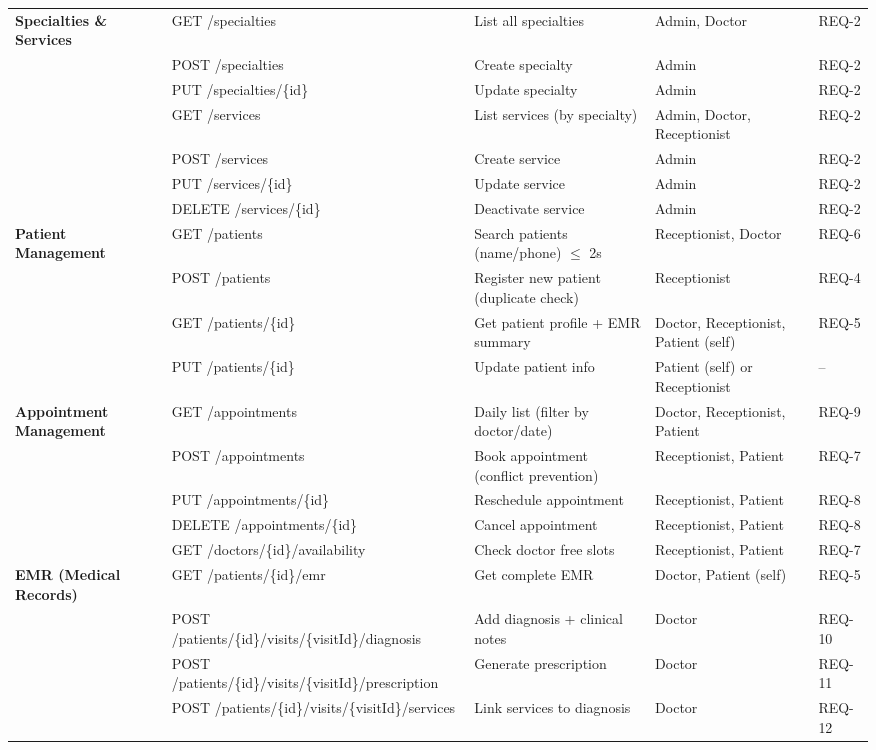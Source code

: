 \begin{longtable}{%
		p{}
		p{}
		p{}
		p{}
		p{}}
	\textbf{Specialties \& Services}
	& GET /specialties          & List all specialties              & Admin, Doctor & REQ-2 \\[8pt]
	& POST /specialties         & Create specialty                  & Admin & REQ-2 \\[8pt]
	& PUT /specialties/\{id\}   & Update specialty                  & Admin & REQ-2 \\[8pt]
	& GET /services             & List services (by specialty)      & Admin, Doctor, Receptionist & REQ-2 \\[8pt]
	& POST /services            & Create service                    & Admin & REQ-2 \\[8pt]
	& PUT /services/\{id\}      & Update service                    & Admin & REQ-2 \\[8pt]
	& DELETE /services/\{id\}   & Deactivate service                & Admin & REQ-2 \\[10pt]
	
	\textbf{Patient Management}
	& GET /patients             & Search patients (name/phone) $\leq$ 2s & Receptionist, Doctor & REQ-6 \\[8pt]
	& POST /patients            & Register new patient (duplicate check) & Receptionist & REQ-4 \\[8pt]
	& GET /patients/\{id\}      & Get patient profile + EMR summary & Doctor, Receptionist, Patient (self) & REQ-5 \\[8pt]
	& PUT /patients/\{id\}      & Update patient info               & Patient (self) or Receptionist & -- \\[10pt]
	
	\textbf{Appointment Management}
	& GET /appointments         & Daily list (filter by doctor/date) & Doctor, Receptionist, Patient & REQ-9 \\[8pt]
	& POST /appointments        & Book appointment (conflict prevention) & Receptionist, Patient & REQ-7 \\[8pt]
	& PUT /appointments/\{id\}  & Reschedule appointment            & Receptionist, Patient & REQ-8 \\[8pt]
	& DELETE /appointments/\{id\} & Cancel appointment              & Receptionist, Patient & REQ-8 \\[8pt]
	& GET /doctors/\{id\}/availability & Check doctor free slots  & Receptionist, Patient & REQ-7 \\[10pt]
	
	\textbf{EMR (Medical Records)}
	& GET /patients/\{id\}/emr  & Get complete EMR                  & Doctor, Patient (self) & REQ-5 \\[8pt]
	& POST /patients/\{id\}/visits/\{visitId\}/diagnosis  & Add diagnosis + clinical notes & Doctor & REQ-10 \\[8pt]
	& POST /patients/\{id\}/visits/\{visitId\}/prescription & Generate prescription & Doctor & REQ-11 \\[8pt]
	& POST /patients/\{id\}/visits/\{visitId\}/services   & Link services to diagnosis & Doctor & REQ-12 \\[10pt]
	

\end{longtable}
